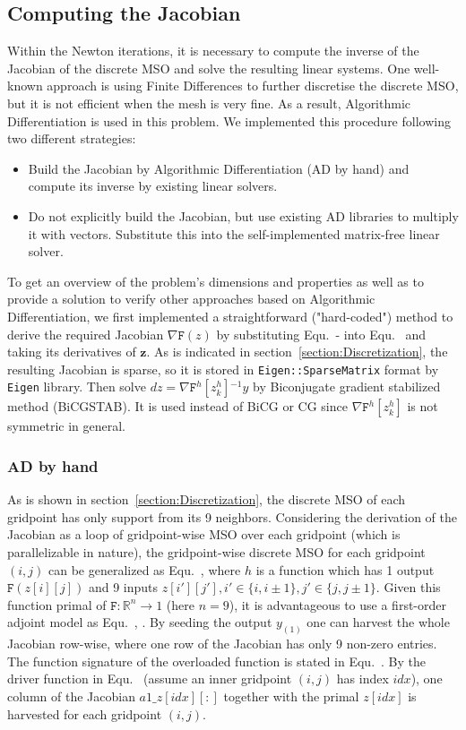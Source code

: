 \documentclass[11pt]{scrartcl}
\newcommand{\mSurfDisc}[1]{\ensuremath{\mathtt{F}^h\left[#1\right]}}
\newcommand{\inv}{\ensuremath{^{-1}}}
\newcommand{\vect}[1]{\boldsymbol{#1}}
\newcommand{\rb}[1]{\left( #1 \right)}
\begin{document}
\subsection{Computing the Jacobian}
Within the Newton iterations, it is necessary to compute the inverse of the Jacobian of the discrete MSO and solve the resulting linear systems. One well-known approach is using Finite Differences to further discretise the discrete MSO, but it is not efficient when the mesh is very fine. As a result, Algorithmic Differentiation is used in this problem. We implemented this procedure following two different strategies:
\begin{itemize}
	\item Build the Jacobian by Algorithmic Differentiation (AD by hand) and compute its inverse by existing linear solvers.
	\item Do not explicitly build the Jacobian, but use existing AD libraries to multiply it with vectors. Substitute this into the self-implemented matrix-free linear solver.
\end{itemize}
To get an overview of the problem's dimensions and properties as well as to provide a solution to verify other approaches based on Algorithmic Differentiation, we first implemented a straightforward ("hard-coded") method to derive the required Jacobian $\nabla \mathtt{F}(z)$ by substituting Equ.~- into Equ.~ and taking its derivatives of $\vect{z}$. As is indicated in section~\ref{section:Discretization}, the resulting Jacobian is sparse, so it is stored in \texttt{Eigen::SparseMatrix} format by \texttt{Eigen} library. Then solve $dz = \nabla\mSurfDisc{z^h_k}\inv y$ by Biconjugate gradient stabilized method (BiCGSTAB). It is used instead of BiCG or CG since $\nabla\mSurfDisc{z^h_k}$ is not symmetric in general.

\subsubsection{AD by hand}
As is shown in section~\ref{section:Discretization}, the discrete MSO of each gridpoint has only support from its 9 neighbors. Considering the derivation of the Jacobian as a loop of gridpoint-wise MSO over each gridpoint (which is parallelizable in nature), the gridpoint-wise discrete MSO for each gridpoint $(i,j)$ can be generalized as Equ.~, where $h$ is a function which has 1 output $\mathtt{F}\rb{z[i][j]}$ and 9 inputs $z[i'][j'], i'\in\{i, i\pm1\}, j'\in\{j,j\pm1\}$. Given this function primal of $ \mathtt{F}: \mathbb{R}^n\rightarrow 1 $ (here $n=9$), it is advantageous to use a first-order adjoint model as Equ.~, . By seeding the output $y_{(1)}$ one can harvest the whole Jacobian row-wise, where one row of the Jacobian has only 9 non-zero entries. The function signature of the overloaded function is stated in Equ.~. By the driver function in Equ.~ (assume an inner gridpoint $(i,j)$ has index $idx$), one column of the Jacobian $a1\_z[idx][:]$ together with the primal $z[idx]$ is harvested for each gridpoint $(i,j)$.
\end{document}
